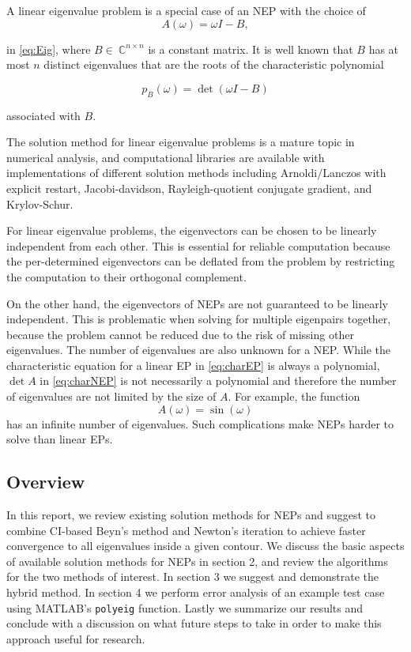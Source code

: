 \documentclass[final,leqno,onefignum,onetabnum]{siamltex1213}
\begin{document}
\pagebreak
A linear eigenvalue problem is a special case of an NEP with the choice of 
\begin{equation} 
\label{eq:LEP}
A(\omega )= \omega I - B,
\end{equation}

in \ref{eq:Eig}, where $B \in\ \mathbb{C}^{n \times n}$ is a constant matrix. It is well known that $B$ has at most $n$ distinct eigenvalues that are the roots of the characteristic polynomial

\begin{equation}
	\label{eq:charEP}
	p_{B}(\omega)=\det(\omega I -B)
\end{equation}  

associated with $B$. 

The solution method for linear eigenvalue problems is a mature topic in numerical analysis, and computational libraries are available with implementations of different solution methods including Arnoldi$/$Lanczos with explicit restart, Jacobi-davidson, Rayleigh-quotient conjugate gradient, and Krylov-Schur.  \citep{hernandez2005slepc} 

For linear eigenvalue problems, the eigenvectors can be chosen to be linearly independent from each other. This is essential for reliable computation because the per-determined eigenvectors can be deflated from the problem by restricting the computation to their orthogonal complement. 

On the other hand, the eigenvectors of NEPs are not guaranteed to be linearly independent. This is problematic when solving for multiple eigenpairs together, because the problem cannot be reduced due to the risk of missing other eigenvalues. The number of eigenvalues are also unknown for a NEP. While the characteristic equation for a linear EP in \ref{eq:charEP} is always a polynomial, $\det A$ in \ref{eq:charNEP} is not necessarily a polynomial and therefore the number of eigenvalues are not limited by the size of $A$. For example, the function
\begin{equation*}
A(\omega) = \sin(\omega)
\end{equation*} 
has an infinite number of eigenvalues. Such complications make NEPs harder to solve than linear EPs. 

\subsection{Overview}
In this report, we review existing solution methods for NEPs and suggest to combine CI-based Beyn's method and Newton's iteration to achieve faster convergence to all eigenvalues inside a given contour. We discuss the basic aspects of available solution methods for NEPs in section 2, and review the algorithms for the two methods of interest. In section 3 we suggest and demonstrate the hybrid method. In section 4 we perform error analysis of an example test case using MATLAB's {\tt polyeig} function. Lastly we summarize our results and conclude with a discussion on what future steps to take in order to make this approach useful for research. 
\end{document}
